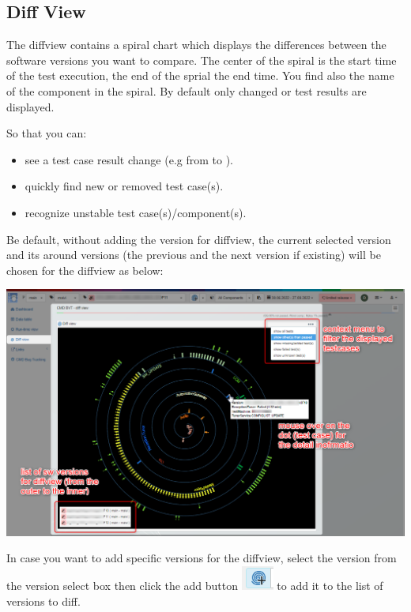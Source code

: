 \hypertarget{diff-view}{%
\subsection{Diff View}\label{diff-view}}
The diffview contains a spiral chart which displays the differences 
between the software versions you want to compare. 
The center of the spiral is the start time of the test execution,
the end of the sprial the end time. You find also the name of the
component in the spiral.
By default only changed or  test results are displayed.

So that you can:
\begin{itemize}
   \item see a test case result change (e.g from  to 
         ).
   \item quickly find new or removed test case(s).
   \item recognize unstable test case(s)/component(s). 
\end{itemize}

Be default, without adding the version for diffview, the current selected 
version and its around versions (the previous and the next version if existing) 
will be chosen for the diffview as below:

\includegraphics[width=1\linewidth]{./pictures/diffview/default_detail.png}

In case you want to add specific versions for the diffview, select the version
from the version select box then click the add button 
\includegraphics[width=0.04\linewidth]{./pictures/diffview/add_button.png}
to add it to the list of versions to diff. 

